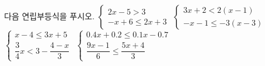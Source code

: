 다음 연립부등식을 푸시오.
 $\begin{cases} 2x-5>3 \\ -x+6\le 2x+3 \end{cases}$
 $\begin{cases} 3x+2<2(x-1) \\ -x-1\le -3(x-3) \end{cases}$
 $\begin{cases} x-4\le 3x+5 \\ \dfrac{3}{4}x<3-\dfrac{4-x}{3} \end{cases}$
 $\begin{cases} 0.4x+0.2\le 0.1x-0.7 \\ \dfrac{9x-1}{6}\le\dfrac{5x+4}{3} \end{cases}$
